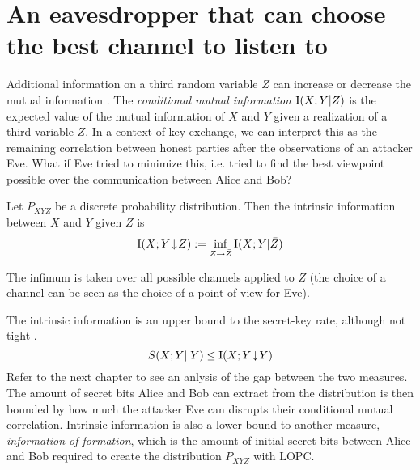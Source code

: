 \section{An eavesdropper that can choose the best channel to listen to}
Additional information on a third random variable $Z$ can increase or decrease the mutual information \cite{CT12}.
    The \emph{conditional mutual information} $\operatorname{I}(X;Y|Z)$ is the expected value of the mutual information of $X$ and $Y$ given a realization of a third variable $Z$.
    In a context of key exchange, we can interpret this as the remaining correlation between honest parties after the observations of an attacker Eve.
    What if Eve tried to minimize this, i.e. tried to find the best viewpoint possible over the communication between Alice and Bob?
    \begin{definition}\cite{MW99, RW03}
    	Let $P_{XYZ}$ be a discrete probability distribution. Then the intrinsic information between $X$ and $Y$ given $Z$ is
    \begin{equation} \label{intrininfo}
    	\operatorname{I}(X;Y\!\downarrow\!Z):= \inf_{Z\rightarrow \bar{Z}} \operatorname{I}(X;Y | \bar{Z})
    \end{equation}
    \end{definition}
    The infimum is taken over all possible channels applied to $Z$ (the choice of a channel can be seen as the choice of a point of view for Eve).
    
    The intrinsic information is an upper bound to the secret-key rate, although not tight \cite{RW03}. 
    \begin{equation} \label{eq:bkeyinfo}
    	S(X;Y||Y) \leq \operatorname{I}(X;Y\!\downarrow\!Y)
    \end{equation}
    Refer to the next chapter to see an anlysis of the gap between the two measures.
    The amount of secret bits Alice and Bob can extract from the distribution is then bounded by how much the attacker Eve can disrupts their conditional mutual correlation.
    Intrinsic information is also a lower bound to another measure, \emph{information of formation}, which is the amount of initial secret bits between Alice and Bob required to create the distribution $P_{XYZ}$ with LOPC.
    
   
